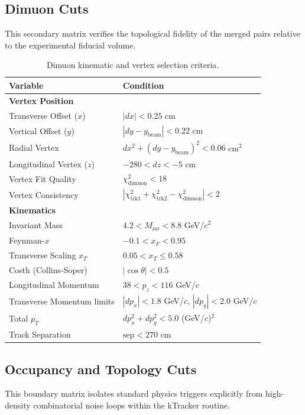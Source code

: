 \documentclass[11pt]{article}
\begin{document}
\subsection{Dimuon Cuts}
This secondary matrix verifies the topological fidelity of the merged pairs relative to the experimental fiducial volume.

\begin{table}[h!]
    \centering
    \caption{Dimuon kinematic and vertex selection criteria.}
    \label{tab:dimuon_cuts}
    \begin{tabular}{@{}ll@{}}
        \toprule
        \textbf{Variable} & \textbf{Condition} \\ 
        \midrule
        \textbf{Vertex Position} & \\
        Transverse Offset ($x$) & $|dx| < 0.25$ cm \\
        Vertical Offset ($y$) & $|dy - y_{\text{beam}}| < 0.22$ cm \\
        Radial Vertex & $dx^2 + (dy - y_{\text{beam}})^2 < 0.06$ cm$^2$ \\
        Longitudinal Vertex ($z$) & $-280 < dz < -5$ cm \\
        Vertex Fit Quality & $\chi^2_{\text{dimuon}} < 18$ \\
        Vertex Consistency & $|\chi^2_{\text{trk1}} + \chi^2_{\text{trk2}} - \chi^2_{\text{dimuon}}| < 2$ \\
        \midrule
        \textbf{Kinematics} & \\
        Invariant Mass & $4.2 < M_{\mu\mu} < 8.8$ GeV/$c^2$ \\
        Feynman-$x$ & $-0.1 < x_F < 0.95$ \\
        Transverse Scaling $x_T$ & $0.05 < x_T \le 0.58$ \\
        Costh (Collins-Soper) & $|\cos \theta| < 0.5$ \\
        Longitudinal Momentum & $38 < p_z < 116$ GeV/$c$ \\
        Transverse Momentum limits & $|dp_x| < 1.8$ GeV/$c$, $|dp_y| < 2.0$ GeV/$c$ \\
        Total $p_T$ & $dp_x^2 + dp_y^2 < 5.0$ (GeV/$c$)$^2$ \\
        Track Separation & $\text{sep} < 270$ cm \\
        \bottomrule
    \end{tabular}
\end{table}

\subsection{Occupancy and Topology Cuts}
This boundary matrix isolates standard physics triggers explicitly from high-density combinatorial noise loops within the kTracker routine.
\end{document}

